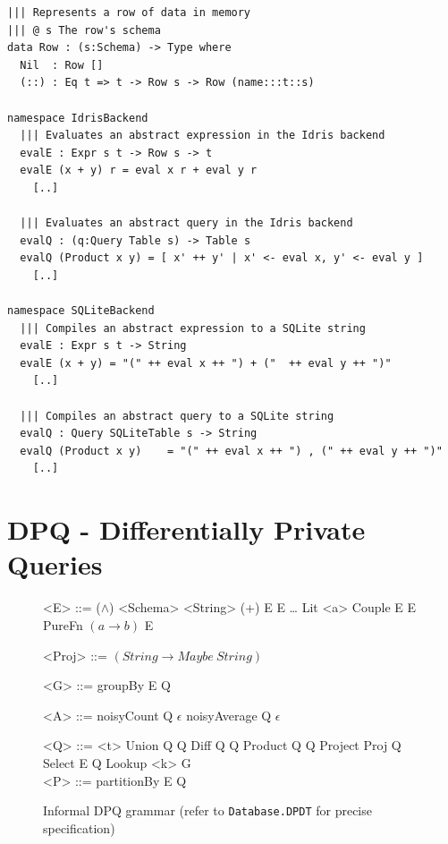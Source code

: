 \documentclass[12pt]{report}
\begin{document}
\begin{lstlisting}[float,caption={Implementing backends (snippets)},label={lst:idris_backend}]
||| Represents a row of data in memory
||| @ s The row's schema
data Row : (s:Schema) -> Type where
  Nil  : Row []
  (::) : Eq t => t -> Row s -> Row (name:::t::s)

namespace IdrisBackend
  ||| Evaluates an abstract expression in the Idris backend
  evalE : Expr s t -> Row s -> t
  evalE (x + y) r = eval x r + eval y r
    [..]

  ||| Evaluates an abstract query in the Idris backend
  evalQ : (q:Query Table s) -> Table s
  evalQ (Product x y) = [ x' ++ y' | x' <- eval x, y' <- eval y ]
    [..]

namespace SQLiteBackend
  ||| Compiles an abstract expression to a SQLite string
  evalE : Expr s t -> String
  evalE (x + y) = "(" ++ eval x ++ ") + ("  ++ eval y ++ ")"
    [..]

  ||| Compiles an abstract query to a SQLite string
  evalQ : Query SQLiteTable s -> String
  evalQ (Product x y)    = "(" ++ eval x ++ ") , (" ++ eval y ++ ")"
    [..]
\end{lstlisting}

\chapter{DPQ - Differentially Private Queries}\label{sec:DPQ}

\begin{figure}[H]
\begin{mdframed}
\begin{minipage}[t]{0.5\textwidth}
  \begin{grammar}
    <E> ::= \phantom
    \alt ($\land$) <Schema> <String>
    \alt (+) E E
    \alt \ldots
    \alt Lit <a>
    \alt Couple E E
    \alt PureFn $(a \rightarrow b)$ E

    <Proj> ::= $(String \rightarrow Maybe\ String)$

    <G> ::= \phantom
    \alt groupBy E Q

    <A> ::= \phantom
    \alt noisyCount Q $\epsilon$
    \alt noisyAverage Q $\epsilon$
  \end{grammar}
\end{minipage} %
\begin{minipage}[t]{0.5\textwidth}
  \begin{grammar}
    <Q> ::= \phantom
    \alt <t>
    \alt Union Q Q
    \alt Diff Q Q
    \alt Product Q Q
    \alt Project Proj Q
    \alt Select E Q
    \alt Lookup <k> G
    \\

    <P> ::= \phantom
    \alt partitionBy E Q
  \end{grammar}
\end{minipage}
\end{mdframed}
\caption{Informal DPQ grammar (refer to \texttt{Database.DPDT} for precise specification)}
\label{gram:radt}
\end{figure}
\end{document}
